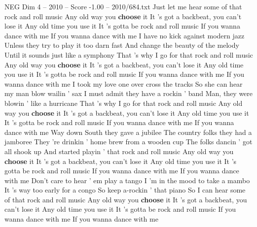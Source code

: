 \begin{textsample}{NEG Dim 4 – 2010 – Score -1.00 – 2010/684.txt}  \label{ex:f4_neg_008}
Just let me hear some of that rock and roll music Any old way you \textbf{choose} it It 's got a backbeat, you can't lose it Any old time you use it It 's gotta be rock and roll music If you wanna dance with me If you wanna dance with me I have no kick against modern jazz Unless they try to play it too darn fast And change the beauty of the melody Until it sounds just like a symphony That 's why I go for that rock and roll music Any old way you \textbf{choose} it It 's got a backbeat, you can't lose it Any old time you use it It 's gotta be rock and roll music If you wanna dance with me If you wanna dance with me I took my love one over cross the tracks So she can hear my man blow wailin ' sax I must admit they have a rockin ' band Man, they were blowin ' like a hurricane That 's why I go for that rock and roll music Any old way you \textbf{choose} it It 's got a backbeat, you can't lose it Any old time you use it It 's gotta be rock and roll music If you wanna dance with me If you wanna dance with me Way down South they gave a jubilee The country folks they had a jamboree They 're drinkin ' home brew from a wooden cup The folks dancin ' got all shook up And started playin ' that rock and roll music Any old way you \textbf{choose} it It 's got a backbeat, you can't lose it Any old time you use it It 's gotta be rock and roll music If you wanna dance with me If you wanna dance with me Don't care to hear ' em play a tango I 'm in the mood to take a mambo It 's way too early for a congo So keep a-rockin ' that piano So I can hear some of that rock and roll music Any old way you \textbf{choose} it It 's got a backbeat, you can't lose it Any old time you use it It 's gotta be rock and roll music If you wanna dance with me If you wanna dance with me

\end{textsample}
